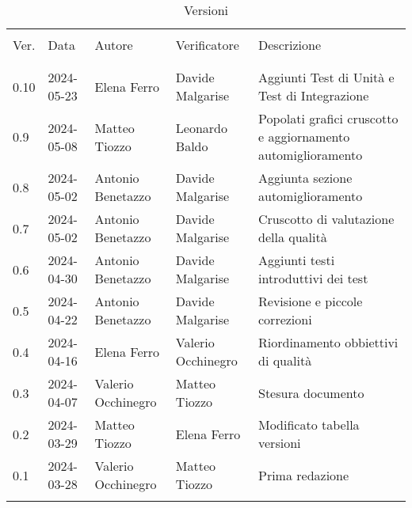 \documentclass[italian,12pt]{article} %
\begin{document}

\newpage

\captionsetup[table]{list=no}
\begin{table}[!h]
	\caption*{Versioni}
	\footnotesize
	\begin{center}
		\begin{tabular}{ l l l l p{6cm} }
			\hline                                                                                                                     \\[-2ex]
			Ver. & Data       & Autore             & Verificatore       & Descrizione                                                  \\
			\\[-2ex] \hline \\[-1.5ex]
			0.10 & 2024-05-23 & Elena Ferro        & Davide Malgarise   & Aggiunti Test di Unità e Test di Integrazione                \\
			0.9  & 2024-05-08 & Matteo Tiozzo      & Leonardo Baldo     & Popolati grafici cruscotto e aggiornamento automiglioramento \\
			0.8  & 2024-05-02 & Antonio Benetazzo  & Davide Malgarise   & Aggiunta sezione automiglioramento                           \\
			0.7  & 2024-05-02 & Antonio Benetazzo  & Davide Malgarise   & Cruscotto di valutazione della qualità                       \\
			0.6  & 2024-04-30 & Antonio Benetazzo  & Davide Malgarise   & Aggiunti testi introduttivi dei test                         \\
			0.5  & 2024-04-22 & Antonio Benetazzo  & Davide Malgarise   & Revisione e piccole correzioni                               \\
			0.4  & 2024-04-16 & Elena Ferro        & Valerio Occhinegro & Riordinamento obbiettivi di qualità                          \\
			0.3  & 2024-04-07 & Valerio Occhinegro & Matteo Tiozzo      & Stesura documento                                            \\
			0.2  & 2024-03-29 & Matteo Tiozzo      & Elena Ferro        & Modificato tabella versioni                                  \\
			0.1  & 2024-03-28 & Valerio Occhinegro & Matteo Tiozzo      & Prima redazione                                              \\
			\\[-1.5ex] \hline
		\end{tabular}
	\end{center}
\end{table}
\captionsetup[table]{list=yes}
\newpage
\tableofcontents
\listoftables
\listoffigures
\newpage





\end{document}
